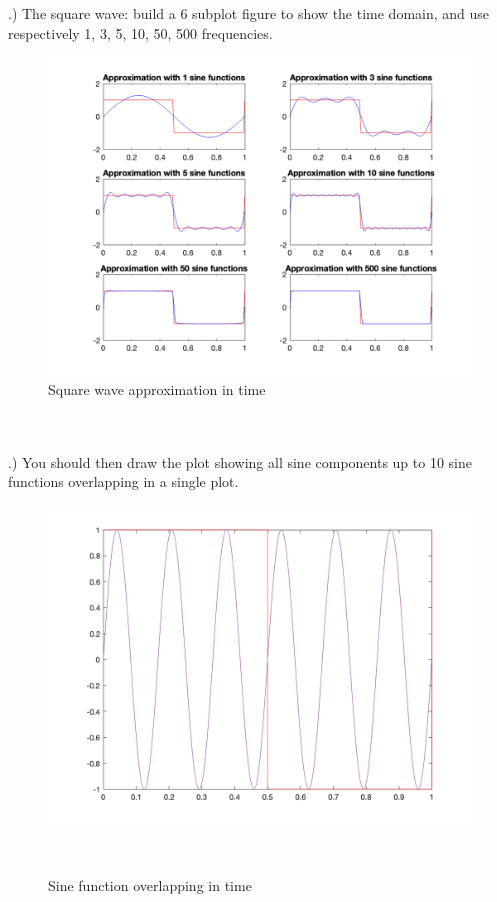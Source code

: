 \documentclass[12pt]{article}
\begin{document}
.) The square wave: build a 6 subplot figure to show the time domain, and use respectively 1, 3, 5, 10, 50, 500 frequencies.\\
\begin{figure}[!h] 
	\begin{centering}
		\includegraphics[keepaspectratio = true, width = 7in]{part1.png}
		\caption{Square wave approximation in time}
	\end{centering}
\end{figure}\\
\\
.) You should then draw the plot showing all sine components up to 10 sine functions overlapping in a single plot.\\
\begin{figure}[!h] 
	\begin{centering}
		\includegraphics[keepaspectratio = true, width = 7in]{two.png}
		\caption{Sine function overlapping in time}
	\end{centering}
	\\
\end{figure}\\
\end{document}

